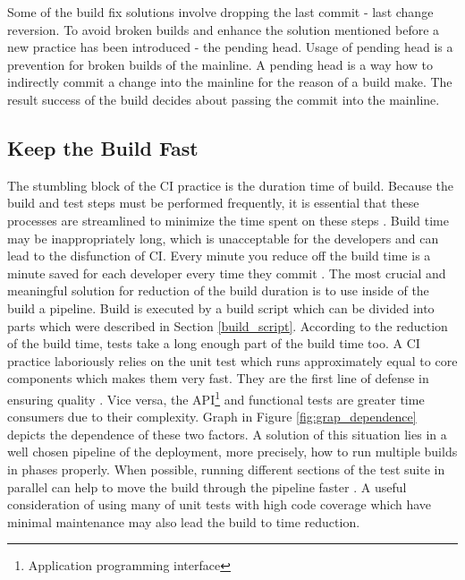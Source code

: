 Some of the build fix solutions involve dropping the last commit - last change reversion. To avoid broken builds and enhance the solution mentioned before a new practice has been introduced - the pending head. Usage of pending head is a prevention for broken builds of the mainline. A pending head is a way how to indirectly commit a change into the mainline for the reason of a build make. The result success of the build decides about passing the commit into the mainline.

\subsection{Keep the Build Fast}

The stumbling block of the CI practice is the duration time of build. Because the build and test steps must be performed frequently, it is essential that these processes are streamlined to minimize the time spent on these steps \cite{DigitalOceanCI}. Build time may be inappropriately long, which is unacceptable for the developers and can lead to the disfunction of CI. Every minute you reduce off the build time is a minute saved for each developer every time they commit \cite{MartinFowler}. The most crucial and meaningful solution for reduction of the build duration is to use inside of the build a pipeline. Build is executed by a build script which can be divided into parts which were described in Section \ref{build_script}. According to the reduction of the build time, tests take a long enough part of the build time too. A CI practice laboriously relies on the unit test which runs approximately equal to core components which makes them very fast. They are the first line of defense in ensuring quality \cite{CI_atlassian}. Vice versa, the API\footnote{Application programming interface} and functional tests are greater time consumers due to their complexity. Graph in Figure \ref{fig:grap_dependence} depicts the dependence of these two factors. A solution of this situation lies in a well chosen pipeline of the deployment, more  precisely, how to run multiple builds in phases properly. When possible, running different sections of the test suite in parallel can help to move the build through the pipeline faster \cite{DigitalOceanCI}. A useful consideration of using many of unit tests with high code coverage which have minimal maintenance may also lead the build to time reduction.

